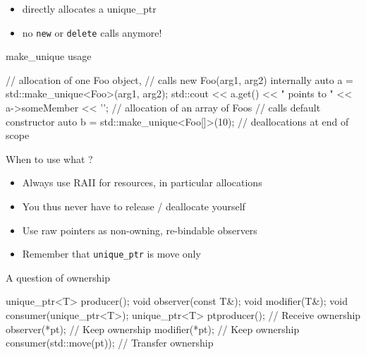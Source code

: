 \begin{frame}[fragile]
  \begin{block}{}
    \begin{itemize}
    \item directly allocates a unique\_ptr
    \item no \texttt{new} or \texttt{delete} calls anymore!
    \end{itemize}
  \end{block}
  \pause
  \begin{exampleblock}{make\_unique usage}
    \begin{cppcode*}{}
      // allocation of one Foo object,
      // calls new Foo(arg1, arg2) internally
      auto a = std::make_unique<Foo>(arg1, arg2);
      std::cout << a.get() << " points to "
                << a->someMember << '\n';
      // allocation of an array of Foos
      // calls default constructor
      auto b = std::make_unique<Foo[]>(10);
      // deallocations at end of scope
    \end{cppcode*}
  \end{exampleblock}
\end{frame}

\begin{frame}[fragile]
  \begin{block}{When to use what ?}
    \begin{itemize}
    \item Always use RAII for resources, in particular allocations
    \item You thus never have to release / deallocate yourself
    \item Use raw pointers as non-owning, re-bindable observers
    \item Remember that \texttt{unique_ptr} is move only
    \end{itemize}
  \end{block}
  \pause
  \begin{exampleblock}{A question of ownership}
    \begin{cppcode*}{}
      unique_ptr<T> producer();
      void observer(const T&);
      void modifier(T&);
      void consumer(unique_ptr<T>);
      unique_ptr<T> pt{producer()}; // Receive ownership
      observer(*pt);                // Keep ownership
      modifier(*pt);                // Keep ownership
      consumer(std::move(pt));      // Transfer ownership
    \end{cppcode*}
  \end{exampleblock}
\end{frame}

